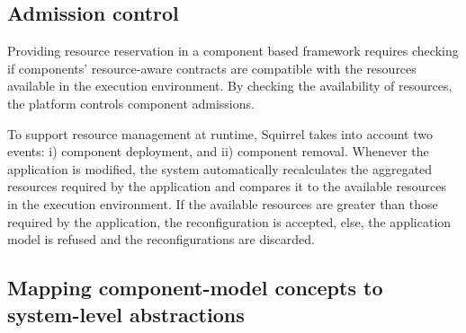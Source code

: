 \subsection{Admission control} \label{sect:admissionControl}

Providing resource reservation in a component based framework requires checking if components' resource-aware contracts are compatible with the resources available in the execution environment.
By checking the availability of resources, the platform controls component admissions.

To support resource management at runtime, Squirrel takes into account two events: i) component deployment, and ii) component removal.
Whenever the application is modified, the system automatically recalculates the aggregated resources required by the application and compares it to the available resources in the execution environment.
If the available resources are greater than those required by the application, the reconfiguration is accepted, else, the application model is refused and the reconfigurations are discarded.


\subsection{Mapping component-model concepts to system-level abstractions}

